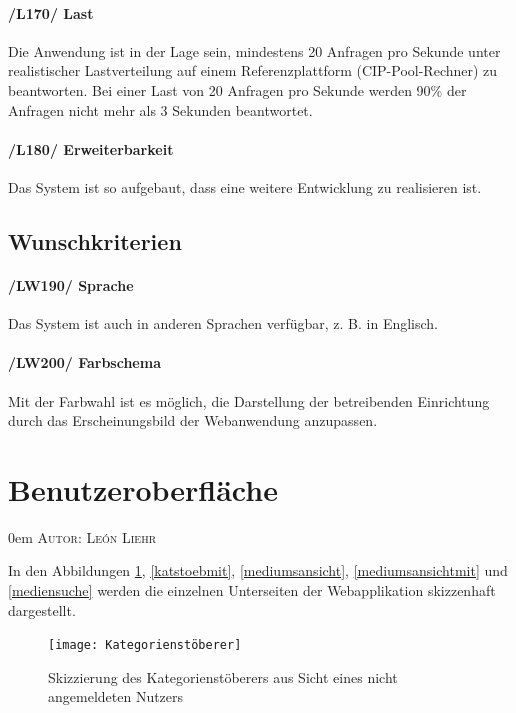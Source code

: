 \documentclass{article}
\makeatletter
\newcommand{\sectionauthor}[1]{
	{\parindent 0em \large \scshape Autor: #1 \par \nobreak \vspace*{2em}}
	\@afterheading
}
\makeatother
\begin{document}
	        \paragraph{
	        /L170/ \label{L170} Last}
	       Die Anwendung ist in der Lage sein, mindestens 20 Anfragen pro Sekunde unter realistischer Lastverteilung auf einem Referenzplattform (CIP-Pool-Rechner) zu beantworten. Bei einer Last von 20 Anfragen pro Sekunde werden 90\% der Anfragen nicht mehr als 3 Sekunden beantwortet.
	       \paragraph{
	        /L180/ \label{L180} Erweiterbarkeit} Das System ist so aufgebaut, dass eine weitere Entwicklung zu  realisieren  ist.
	
\subsection{Wunschkriterien}
	    \paragraph{/LW190/ \label{LW190} Sprache}
	    Das System ist auch in anderen Sprachen verfügbar, z. B. in Englisch.
	    
\paragraph{/LW200/ \label{LW210} Farbschema}	    	       
	       Mit der Farbwahl ist es möglich, die Darstellung der betreibenden Einrichtung durch das Erscheinungsbild der Webanwendung anzupassen.

\section{Benutzeroberfläche} %
\sectionauthor{León Liehr}

In den Abbildungen \ref{katstoeb}, \ref{katstoebmit}, \ref{mediumsansicht}, \ref{mediumsansichtmit} und \ref{mediensuche} werden die einzelnen Unterseiten der Webapplikation skizzenhaft dargestellt.

\begin{figure}[h]
    \centering
    \texttt{[image: Kategorienstöberer]}
    \caption{Skizzierung des Kategorienstöberers aus Sicht eines nicht angemeldeten Nutzers}
    \label{katstoeb}
\end{figure}
\end{document}
